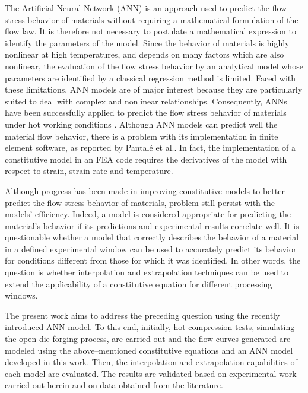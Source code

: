 \documentclass[metals,article,submit,pdftex,moreauthors]{Definitions/mdpi}
\makeatletter
\DeclareRobustCommand{\eal}{et al.\@\xspace}
\makeatother
\begin{document}
The Artificial Neural Network (ANN) is an approach used to predict the flow stress behavior of materials without requiring a mathematical formulation of the flow law.
It is therefore not necessary to postulate a mathematical expression to identify the parameters of the model.
Since the behavior of materials is highly nonlinear at high temperatures, and depends on many factors which are also nonlinear, the evaluation of the flow stress behavior by an analytical model whose parameters are identified by a classical regression method is limited.
Faced with these limitations, ANN models are of major interest because they are particularly suited to deal with complex and nonlinear relationships.
Consequently, ANNs have been successfully applied to predict the flow stress behavior of materials under hot working conditions \cite{wu2022experimental, stoffel2020deep, Ashtiani-2016-CSP, Stoffel-2019-NNB}.
Although ANN models can predict well the material flow behavior, there is a problem with its implementation in finite element software, as reported by Pantalé \eal \cite{Pantale-2021, Pantale-2023}.
In fact, the implementation of a constitutive model in an FEA code requires the derivatives of the model with respect to strain, strain rate and temperature.

Although progress has been made in improving constitutive models to better predict the flow stress behavior of materials, problem still persist with the models' efficiency.
Indeed, a model is considered appropriate for predicting the material's behavior if its predictions and experimental results correlate well.
It is questionable whether a model that correctly describes the behavior of a material in a defined experimental window can be used to accurately predict its behavior for conditions different from those for which it was identified.
In other words, the question is whether interpolation and extrapolation techniques can be used to extend the applicability of a constitutive equation for different processing windows.

The present work aims to address the preceding question using the recently introduced ANN model.
To this end, initially, hot compression tests, simulating the open die forging process, are carried out and the flow curves generated are modeled using the above--mentioned constitutive equations and an ANN model developed in this work.
Then, the interpolation and extrapolation capabilities of each model are evaluated.
The results are validated based on experimental work carried out herein and on data obtained from the literature.
\end{document}
